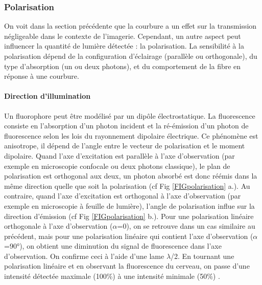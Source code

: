 \subsubsection{Polarisation}


On voit dans la section précédente que la courbure a un effet sur la transmission négligeable dans le contexte de l'imagerie. Cependant, un autre aspect peut influencer la quantité de lumière détectée : la polarisation. La sensibilité à la polarisation dépend de la configuration d'éclairage (parallèle ou orthogonale), du type d'absorption (un ou deux photons), et du comportement de la fibre en réponse à une courbure.

\paragraph{Direction d'illumination}

Un fluorophore peut être modélisé par un dipôle électrostatique. La fluorescence consiste en l'absorption d'un photon incident et la ré-émission d'un photon de fluorescence selon les lois du rayonnement dipolaire électrique. Ce phénomène est anisotrope, il dépend de l'angle entre le vecteur de polarisation et le moment dipolaire. Quand l'axe d'excitation est parallèle à l'axe d'observation (par exemple en microscopie confocale ou deux photons classique), le plan de polarisation est orthogonal aux deux, un photon absorbé est donc réémis dans la même direction quelle que soit la polarisation (cf Fig \ref{FIGpolarisation} a.). Au contraire, quand l'axe d'excitation est orthogonal à l'axe d'observation (par exemple en microscopie à feuille de lumière), l'angle de polarisation influe sur la direction d'émission (cf Fig \ref{FIGpolarisation} b.). Pour une polarisation linéaire orthogonale à l'axe d'observation ($\alpha$=0), on se retrouve dans un cas similaire au précédent, mais pour une polarisation linéaire qui contient l'axe d'observation ($\alpha$=90°), on obtient une diminution du signal de fluorescence dans l'axe d'observation.
On confirme ceci à l'aide d'une lame $\lambda$/2. En tournant une polarisation linéaire et en observant la fluorescence du cerveau, on passe d'une intensité détectée maximale (100\%) à une intensité minimale (50\%) \cite{de_vito_effects_2020}.

